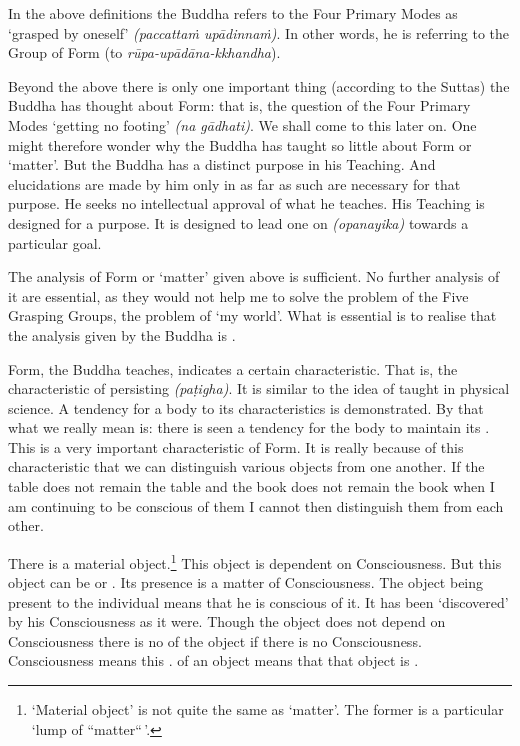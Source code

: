 In the above definitions the Buddha refers to the Four Primary Modes as `grasped by oneself' \emph{(paccattaṁ upādinnaṁ)}. In other words, he is referring to the  Group of Form (to \emph{rūpa-upādāna-kkhandha}).

Beyond the above there is only one important thing (according to the Suttas) the Buddha has thought about Form: that is, the question of the Four Primary Modes `getting no footing' \emph{(na gādhati)}. We shall come to this later on. One might therefore wonder why the Buddha has taught so little about Form or `matter'. But the Buddha has a distinct purpose in his Teaching. And elucidations are made by him only in as far as such are necessary for that purpose. He seeks no intellectual approval of what he teaches. His Teaching is designed for a purpose. It is designed to lead one on \emph{(opanayika)} towards a particular goal.

The analysis of Form or `matter' given above is sufficient. No further analysis of it are essential, as they would not help me to solve the problem of the Five Grasping Groups, the problem of `my world'. What is essential is to realise that the analysis given by the Buddha is .

Form, the Buddha teaches, indicates a certain characteristic. That is, the characteristic of persisting \emph{(paṭigha)}. It is similar to the idea of  taught in physical science. A tendency for a body to  its characteristics is demonstrated. By that what we really mean is: there is seen a tendency for the body to maintain its . This is a very important characteristic of Form. It is really because of this characteristic that we can distinguish various objects from one another. If the table does not remain the table and the book does not remain the book when I am continuing to be conscious of them I cannot then distinguish them from each other.

There is a material object.\footnote{`Material object' is not quite the same as `matter'. The former is a particular `lump of ``matter``\,'.} This object is  dependent on Consciousness. But this object can be  or . Its presence is a matter of Consciousness. The object being present to the individual means that he is conscious of it. It has been `discovered' by his Consciousness as it were. Though the object does not depend on Consciousness there is no  of the object if there is no Consciousness. Consciousness means this .  of an object means that that object is .


